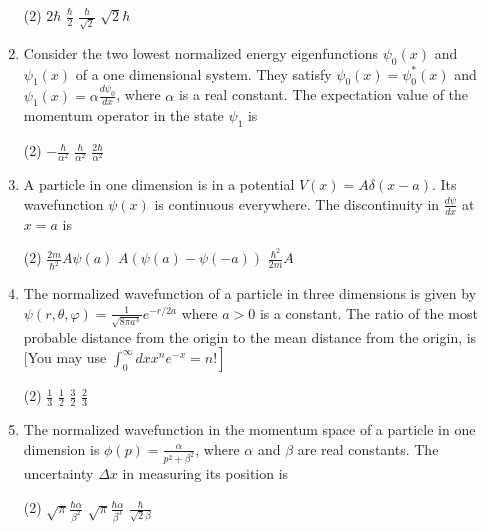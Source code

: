 \begin{enumerate}
	{}
\begin{tasks}(2)
	\task[\textbf{A.}] $2 \hbar$
	\task[\textbf{B.}]$\frac{\hbar}{2}$
	\task[\textbf{C.}]$\frac{\hbar}{\sqrt{2}}$
	\task[\textbf{D.}]$\sqrt{2} \hbar$
\end{tasks}
	\item Consider the two lowest normalized energy eigenfunctions $\psi_{0}(x)$ and $\psi_{1}(x)$ of a one dimensional system. They satisfy $\psi_{0}(x)=\psi_{0}^{*}(x)$ and $\psi_{1}(x)=\alpha \frac{d \psi_{0}}{d x}$, where $\alpha$ is a real constant. The expectation value of the momentum operator in the state $\psi_{1}$ is
	{}
\begin{tasks}(2)
	\task[\textbf{A.}] $-\frac{\hbar}{\alpha^{2}}$
	\task[\textbf{C.}]$\frac{\hbar}{\alpha^{2}}$
	\task[\textbf{D.}]$\frac{2 \hbar}{\alpha^{2}}$
\end{tasks}
	\item A particle in one dimension is in a potential $V(x)=A \delta(x-a)$. Its wavefunction $\psi(x)$ is continuous everywhere. The discontinuity in $\frac{d \psi}{d x}$ at $x=a$ is
	{}
\begin{tasks}(2)
	\task[\textbf{A.}] $\frac{2 m}{\hbar^{2}} A \psi(a)$
	\task[\textbf{B.}]$A(\psi(a)-\psi(-a))$
	\task[\textbf{C.}]$\frac{\hbar^{2}}{2 m} A$
\end{tasks}
	\item The normalized wavefunction of a particle in three dimensions is given by $\psi(r, \theta, \varphi)=\frac{1}{\sqrt{8 \pi a^{3}}} e^{-r / 2 a}$ where $a>0$ is a constant. The ratio of the most probable distance from the origin to the mean distance from the origin, is
	[You may use $\left.\int_{0}^{\infty} d x x^{n} e^{-x}=n !\right]$
	{}
\begin{tasks}(2)
	\task[\textbf{A.}] $\frac{1}{3}$
	\task[\textbf{B.}]$\frac{1}{2}$
	\task[\textbf{C.}]$\frac{3}{2}$
	\task[\textbf{D.}]$\frac{2}{3}$
\end{tasks}
	\item The normalized wavefunction in the momentum space of a particle in one dimension is $\phi(p)=\frac{\alpha}{p^{2}+\beta^{2}}$, where $\alpha$ and $\beta$ are real constants. The uncertainty $\Delta x$ in measuring its position is
{	}
\begin{tasks}(2)
	\task[\textbf{A.}] $\sqrt{\pi} \frac{\hbar \alpha}{\beta^{2}}$
	\task[\textbf{B.}]$\sqrt{\pi} \frac{\hbar \alpha}{\beta^{3}}$
	\task[\textbf{C.}]$\frac{\hbar}{\sqrt{2} \beta}$

\end{tasks}
\end{enumerate}
